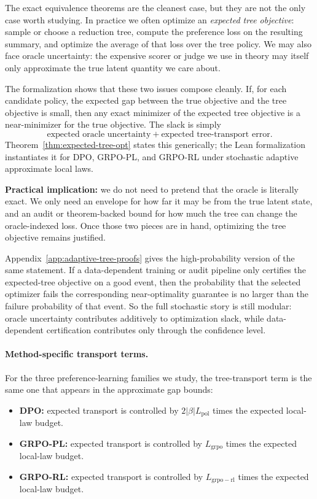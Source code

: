 The exact equivalence theorems are the cleanest case, but they are not the only
case worth studying. In practice we often optimize an \emph{expected tree
objective}: sample or choose a reduction tree, compute the preference loss on
the resulting summary, and optimize the average of that loss over the tree
policy. We may also face oracle uncertainty: the expensive scorer or judge we
use in theory may itself only approximate the true latent quantity we care
about.

The formalization shows that these two issues compose cleanly. If, for each
candidate policy, the expected gap between the true objective and the tree
objective is small, then any exact minimizer of the expected tree objective is a
near-minimizer for the true objective. The slack is simply
\[
\text{expected oracle uncertainty} + \text{expected tree-transport error}.
\]
Theorem~\ref{thm:expected-tree-opt} states this generically; the Lean
formalization instantiates it for DPO, GRPO-PL, and GRPO-RL under stochastic
adaptive approximate local laws.

\textbf{Practical implication:} we do not need to pretend that the oracle is
literally exact. We only need an envelope for how far it may be from the true
latent state, and an audit or theorem-backed bound for how much the tree can
change the oracle-indexed loss. Once those two pieces are in hand, optimizing
the tree objective remains justified.

Appendix~\ref{app:adaptive-tree-proofs} gives the high-probability version of
the same statement.
If a data-dependent training or audit pipeline only certifies the expected-tree
objective on a good event, then the probability that the selected optimizer
fails the corresponding near-optimality guarantee is no larger than the failure
probability of that event. So the full stochastic story is still modular:
oracle uncertainty contributes additively to optimization slack, while
data-dependent certification contributes only through the confidence level.

\paragraph{Method-specific transport terms.}
For the three preference-learning families we study, the tree-transport term is
the same one that appears in the approximate gap bounds:
\begin{itemize}[nosep]
    \item \textbf{DPO:} expected transport is controlled by
    $2|\beta|L_{\mathrm{pol}}$ times the expected local-law budget.
    \item \textbf{GRPO-PL:} expected transport is controlled by
    $L_{\mathrm{grpo}}$ times the expected local-law budget.
    \item \textbf{GRPO-RL:} expected transport is controlled by
    $L_{\mathrm{grpo-rl}}$ times the expected local-law budget.
\end{itemize}


